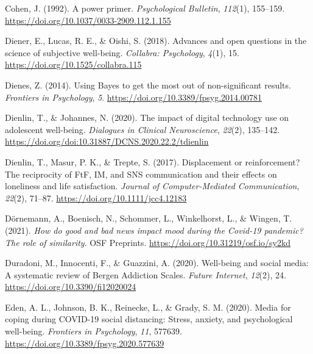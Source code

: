 \documentclass[
  man,mask]{apa7}
\newlength{\cslhangindent}
\newlength{\cslentryspacingunit} %
\newenvironment{CSLReferences}[2] %
 {%
  \setlength{\parindent}{0pt}
  \ifodd #1
  \let\oldpar\par
  \def\par{\hangindent=\cslhangindent\oldpar}
  \fi
  \setlength{\parskip}{#2\cslentryspacingunit}
 }%
 {}
\begin{document}
\begin{CSLReferences}{1}{0}
\leavevmode{}%
Cohen, J. (1992). A power primer. \emph{Psychological Bulletin}, \emph{112}(1), 155--159. \url{https://doi.org/10.1037/0033-2909.112.1.155}

\leavevmode{}%
Diener, E., Lucas, R. E., \& Oishi, S. (2018). Advances and open questions in the science of subjective well-being. \emph{Collabra: Psychology}, \emph{4}(1), 15. \url{https://doi.org/10.1525/collabra.115}

\leavevmode{}%
Dienes, Z. (2014). Using {Bayes} to get the most out of non-significant results. \emph{Frontiers in Psychology}, \emph{5}. \url{https://doi.org/10.3389/fpsyg.2014.00781}

\leavevmode{}%
Dienlin, T., \& Johannes, N. (2020). The impact of digital technology use on adolescent well-being. \emph{Dialogues in Clinical Neuroscience}, \emph{22}(2), 135--142. \url{https://doi.org/doi:10.31887/DCNS.2020.22.2/tdienlin}

\leavevmode{}%
Dienlin, T., Masur, P. K., \& Trepte, S. (2017). Displacement or reinforcement? {The} reciprocity of {FtF}, {IM}, and {SNS} communication and their effects on loneliness and life satisfaction. \emph{Journal of Computer-Mediated Communication}, \emph{22}(2), 71--87. \url{https://doi.org/10.1111/jcc4.12183}

\leavevmode{}%
Dörnemann, A., Boenisch, N., Schommer, L., Winkelhorst, L., \& Wingen, T. (2021). \emph{How do good and bad news impact mood during the {Covid-19} pandemic? {The} role of similarity}. {OSF Preprints}. \url{https://doi.org/10.31219/osf.io/sy2kd}

\leavevmode{}%
Duradoni, M., Innocenti, F., \& Guazzini, A. (2020). Well-being and social media: {A} systematic review of {Bergen Addiction Scales}. \emph{Future Internet}, \emph{12}(2), 24. \url{https://doi.org/10.3390/fi12020024}

\leavevmode{}%
Eden, A. L., Johnson, B. K., Reinecke, L., \& Grady, S. M. (2020). Media for coping during {COVID-19} social distancing: {Stress}, anxiety, and psychological well-being. \emph{Frontiers in Psychology}, \emph{11}, 577639. \url{https://doi.org/10.3389/fpsyg.2020.577639}


\end{CSLReferences}
\end{document}
